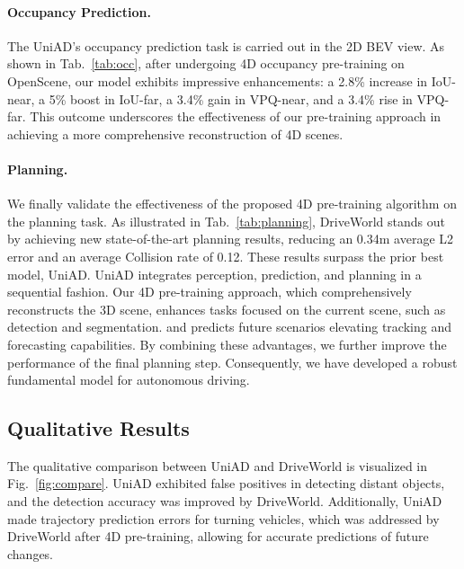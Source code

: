 \paragraph{Occupancy Prediction.}
The UniAD's occupancy prediction task is carried out in the 2D BEV view. As shown in Tab.~\ref{tab:occ}, after undergoing 4D occupancy pre-training on OpenScene, our model exhibits impressive enhancements: a 2.8\% increase in IoU-near, a 5\% boost in IoU-far, a 3.4\% gain in VPQ-near, and a 3.4\% rise in VPQ-far. This outcome underscores the effectiveness of our pre-training approach in achieving a more comprehensive reconstruction of 4D scenes.
\paragraph{Planning.}
We finally validate the effectiveness of the proposed 4D pre-training algorithm on the planning task. As illustrated in Tab.~\ref{tab:planning}, DriveWorld stands out by achieving new state-of-the-art planning results, reducing an 0.34m average L2 error and an average Collision rate of 0.12. These results surpass the prior best model, UniAD. UniAD integrates perception, prediction, and planning in a sequential fashion. Our 4D pre-training approach, which comprehensively reconstructs the 3D scene, enhances tasks focused on the current scene, such as detection and segmentation. and predicts future scenarios elevating tracking and forecasting capabilities. By combining these advantages, we further improve the performance of the final planning step. Consequently, we have developed a robust fundamental model for autonomous driving. 

\subsection{Qualitative Results}
The qualitative comparison between UniAD and DriveWorld is visualized in Fig.~\ref{fig:compare}. UniAD exhibited false positives in detecting distant objects, and the detection accuracy was improved by DriveWorld. Additionally, UniAD made trajectory prediction errors for turning vehicles, which was addressed by DriveWorld after 4D pre-training, allowing for accurate predictions of future changes.
